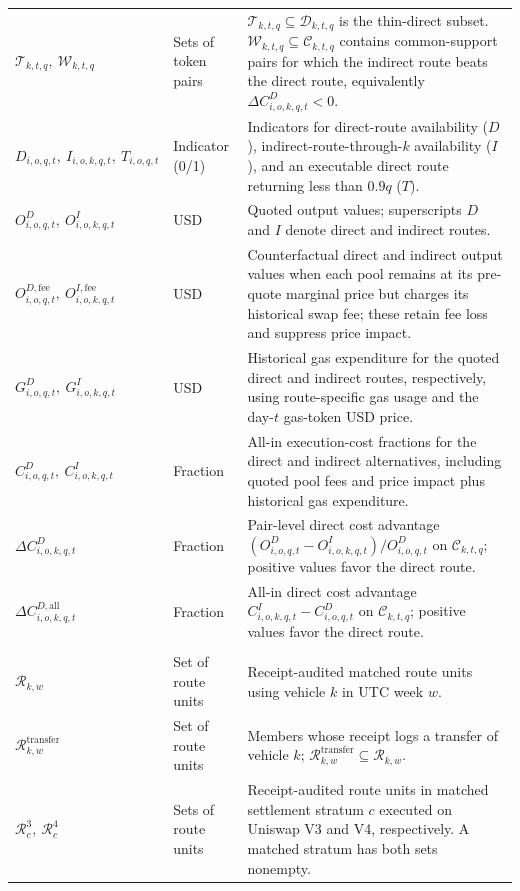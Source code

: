 \begin{tabularx}{\linewidth}{@{}>{\raggedright\arraybackslash}Xl>{\raggedright\arraybackslash}X@{}}
$\mathcal{T}_{k,t,q},\ \mathcal{W}_{k,t,q}$ & Sets of token pairs & $\mathcal T_{k,t,q}\subseteq\mathcal D_{k,t,q}$ is the thin-direct subset. $\mathcal W_{k,t,q}\subseteq\mathcal C_{k,t,q}$ contains common-support pairs for which the indirect route beats the direct route, equivalently $\Delta C^D_{i,o,k,q,t}<0$. \\
$D_{i,o,q,t},\ I_{i,o,k,q,t},\ T_{i,o,q,t}$ & Indicator (0/1) & Indicators for direct-route availability ($D$), indirect-route-through-$k$ availability ($I$), and an executable direct route returning less than $0.9q$ ($T$). \\
$O^{D}_{i,o,q,t},\ O^{I}_{i,o,k,q,t}$ & USD & Quoted output values; superscripts $D$ and $I$ denote direct and indirect routes. \\
$O^{D,\mathrm{fee}}_{i,o,q,t},\ O^{I,\mathrm{fee}}_{i,o,k,q,t}$ & USD & Counterfactual direct and indirect output values when each pool remains at its pre-quote marginal price but charges its historical swap fee; these retain fee loss and suppress price impact. \\
$G^{D}_{i,o,q,t},\ G^{I}_{i,o,k,q,t}$ & USD & Historical gas expenditure for the quoted direct and indirect routes, respectively, using route-specific gas usage and the day-$t$ gas-token USD price. \\
$C^{D}_{i,o,q,t},\ C^{I}_{i,o,k,q,t}$ & Fraction & All-in execution-cost fractions for the direct and indirect alternatives, including quoted pool fees and price impact plus historical gas expenditure. \\
$\Delta C^D_{i,o,k,q,t}$ & Fraction & Pair-level direct cost advantage $(O^{D}_{i,o,q,t}-O^{I}_{i,o,k,q,t})/O^{D}_{i,o,q,t}$ on $\mathcal C_{k,t,q}$; positive values favor the direct route. \\
$\Delta C^{D,\mathrm{all}}_{i,o,k,q,t}$ & Fraction & All-in direct cost advantage $C^{I}_{i,o,k,q,t}-C^{D}_{i,o,q,t}$ on $\mathcal C_{k,t,q}$; positive values favor the direct route. \\
\addlinespace
\multicolumn{3}{@{}l}{\textit{Settlement objects and operators}} \\
$\mathcal{R}_{k,w}$ & Set of route units & Receipt-audited matched route units using vehicle $k$ in UTC week $w$. \\
$\mathcal{R}^{\mathrm{transfer}}_{k,w}$ & Set of route units & Members whose receipt logs a transfer of vehicle $k$; $\mathcal R^{\mathrm{transfer}}_{k,w}\subseteq\mathcal R_{k,w}$. \\
$\mathcal R^3_c,\ \mathcal R^4_c$ & Sets of route units & Receipt-audited route units in matched settlement stratum $c$ executed on Uniswap V3 and V4, respectively. A matched stratum has both sets nonempty. \\

\end{tabularx}
